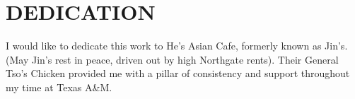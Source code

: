 %
%
%
%

\chapter*{DEDICATION}



\begin{center}
\vspace*{\fill}
I would like to dedicate this work to He's Asian Cafe, formerly known as Jin's.  (May Jin's rest in peace, driven out by high Northgate rents). Their General Tso's Chicken provided me with a pillar of consistency and support throughout my time at Texas A\&M. 
\vspace*{\fill}
\end{center}

\pagebreak{}

